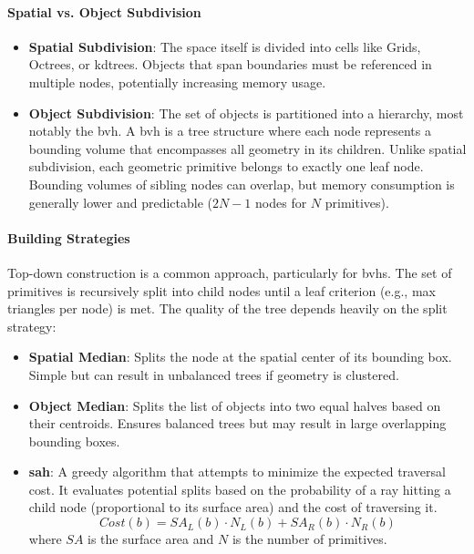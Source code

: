 \paragraph{Spatial vs. Object Subdivision}\label{par:subdivision-types}

\begin{itemize}
    \item \textbf{Spatial Subdivision}:
        The space itself is divided into cells like Grids, Octrees, or \glspl{kdtree}.
        Objects that span boundaries must be referenced in multiple nodes, potentially increasing memory usage.
    \item \textbf{Object Subdivision}:
        The set of objects is partitioned into a hierarchy, most notably the \gls{bvh}.
        A \gls{bvh} is a tree structure where each node represents a bounding volume
        that encompasses all geometry in its children.
        Unlike spatial subdivision, each geometric primitive belongs to exactly one leaf node.
        Bounding volumes of sibling nodes can overlap,
        but memory consumption is generally lower and predictable ($2N-1$ nodes for $N$ primitives).
\end{itemize}

\paragraph{Building Strategies}\label{par:building-strategies}

Top-down construction is a common approach, particularly for \glspl{bvh}.
The set of primitives is recursively split into child nodes
until a leaf criterion (e.g., max triangles per node) is met.
The quality of the tree depends heavily on the split strategy:

\begin{itemize}
    \item \textbf{Spatial Median}:
        Splits the node at the spatial center of its bounding box.
        Simple but can result in unbalanced trees if geometry is clustered.
    \item \textbf{Object Median}:
        Splits the list of objects into two equal halves based on their centroids.
        Ensures balanced trees but may result in large overlapping bounding boxes.
    \item \textbf{\gls{sah}}:
        A greedy algorithm that attempts to minimize the expected traversal cost.
        It evaluates potential splits based on the probability of a ray hitting a child node
        (proportional to its surface area) and the cost of traversing it.
        \[
        Cost(b) = SA_L(b) \cdot N_L(b) + SA_R(b) \cdot N_R(b)
        \]
        where $SA$ is the surface area and $N$ is the number of primitives.
\end{itemize}

